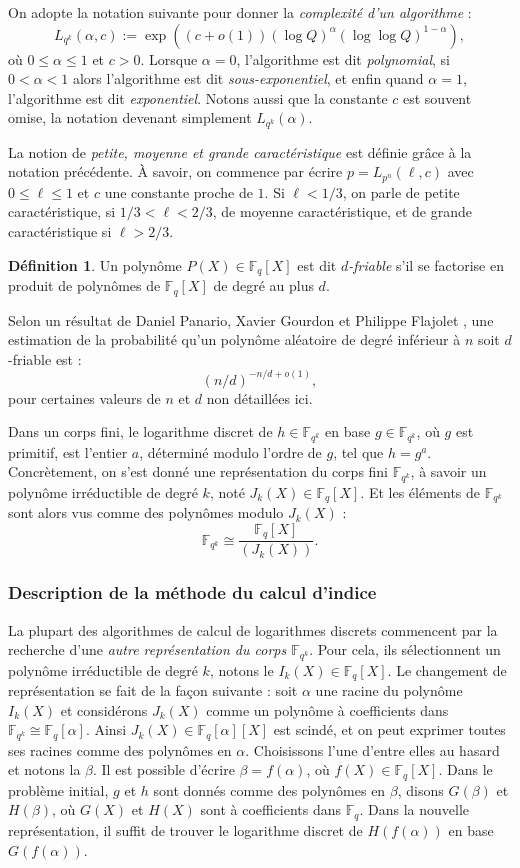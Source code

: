 \documentclass[a4paper, titlepage, 11pt]{article}
\theoremstyle{definition}
\newtheorem{defi}[theo]{Définition}
\theoremstyle{remark}
\def\o{o}
\def\gf #1{\mathbb{F}_{#1}}
\begin{document}
On adopte la notation suivante pour donner la \textit{complexité d'un algorithme} :
$$L_{q^k}(\alpha, c) := \exp\left({(c+\o(1))(\log Q)^\alpha(\log\log Q)^{1 - \alpha}}\right),$$
où $0 \leqslant \alpha\leqslant 1$ et $c > 0$. Lorsque $\alpha = 0$, l'algorithme est dit \textit{polynomial}, si $0 < \alpha < 1$ alors l'algorithme est dit \textit{sous-exponentiel}, et enfin quand $\alpha = 1$, l'algorithme est dit \textit{exponentiel}. Notons aussi que la constante $c$ est souvent omise, la notation devenant simplement $L_{q^k}(\alpha)$.

La notion de \textit{petite, moyenne et grande caractéristique} est définie grâce à la notation précédente. À savoir, on commence par écrire $p = L_{p^n}(\ell,c)$ avec $0\leqslant\ell\leqslant 1$ et $c$ une constante proche de $1$. Si $\ell < 1/3$, on parle de petite caractéristique, si $1/3 < \ell < 2/3$, de moyenne caractéristique, et de grande caractéristique si $\ell > 2/3$.

\begin{defi}
Un polynôme $P(X) \in \gf{q}[X]$ est dit \textit{$d$-friable} s'il se factorise en produit de polynômes de $\gf{q}[X]$ de degré au plus $d$.
\end{defi}

Selon un résultat de Daniel Panario, Xavier Gourdon et Philippe Flajolet \cite{PGF98}, une estimation de la probabilité qu'un polynôme aléatoire de degré inférieur à $n$ soit $d$-friable est :
$${(n/d)}^{-n/d + \o(1)},$$
pour certaines valeurs de $n$ et $d$ non détaillées ici.

Dans un corps fini, le logarithme discret de $h \in \gf{q^k}$ en base $g \in \gf{q^k}$, où $g$ est primitif, est l'entier $a$, déterminé modulo l'ordre de $g$, tel que $h = g^a$. Concrètement, on s'est donné une représentation du corps fini $\gf{q^k}$, à savoir un polynôme irréductible de degré $k$, noté $J_k(X) \in \gf{q}[X]$. Et les éléments de $\gf{q^k}$ sont alors vus comme des polynômes modulo $J_k(X)$ :
$$\gf{q^k} \cong \frac{\gf{q}[X]}{(J_k(X))}.$$

\subsubsection{Description de la méthode du calcul d'indice}
La plupart des algorithmes de calcul de logarithmes discrets commencent par la recherche d'une \textit{autre représentation du corps $\gf{q^k}$}. Pour cela, ils sélectionnent un polynôme irréductible de degré $k$, notons le $I_k(X) \in \gf{q}[X]$. Le changement de représentation se fait de la façon suivante : soit $\alpha$ une racine du polynôme $I_k(X)$ et considérons $J_k(X)$ comme un polynôme à coefficients dans $\gf{q^k} \cong \gf{q}[\alpha]$. Ainsi $J_k(X) \in \gf{q}[\alpha][X]$ est scindé, et on peut exprimer toutes ses racines comme des polynômes en $\alpha$. Choisissons l'une d'entre elles au hasard et notons la $\beta$. Il est possible d'écrire $\beta = f(\alpha)$, où $f(X) \in \gf{q}[X]$. Dans le problème initial, $g$ et $h$ sont donnés comme des polynômes en $\beta$, disons $G(\beta)$ et $H(\beta)$, où $G(X)$ et $H(X)$ sont à coefficients dans $\gf{q}$. Dans la nouvelle représentation, il suffit de trouver le logarithme discret de $H(f(\alpha))$ en base $G(f(\alpha))$.
\end{document}
